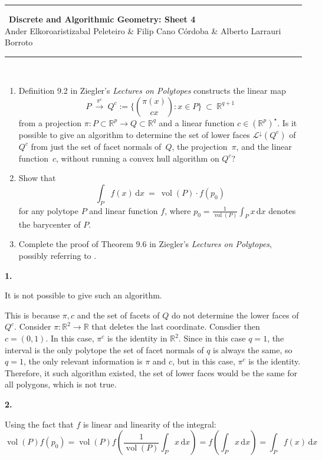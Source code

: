 \documentclass[10pt,a4paper]{article}
\DeclareMathOperator{\vol}{vol}
\newcommand{\RR}{\mathbb{R}}
\theoremstyle{plain}
\theoremstyle{remark}
\theoremstyle{definition}
\begin{document}
\thispagestyle{plain}
\begin{center}
\rule{\linewidth}{0.05mm}\
{\Large \textbf{Discrete and Algorithmic Geometry: Sheet 4\\}}
{\large Ander Elkoroaristizabal Peleteiro \& Filip Cano Córdoba \& Alberto Larrauri Borroto\\}
\rule{\linewidth}{0.05mm}\
\end{center}

\begin{enumerate}
	\item Definition 9.2 in Ziegler's \textit{Lectures on Polytopes} constructs the linear map
	\[
	P
	\ \xrightarrow{\pi^c}\ 
	Q^c :=
	\Big\{ \binom{\pi(x)}{cx} : x\in P\Big\}
	\ \subset \
	\RR^{q+1}
	\]
	from a projection $\pi:P\subset\RR^p\to Q\subset\RR^q$ and a linear function $c\in(\RR^p)^\star$.
	Is it possible to give an algorithm to determine the set of lower faces 
	$\mathcal L^\downarrow(Q^c)$ of $Q^c$ 
	from just the set of facet normals of~$Q$, 
	the projection~$\pi$, and the linear function~$c$, without running a convex hull algorithm on $Q^c$?
	
	\bigskip\bigskip
	\item Show that
	\[
	\int_P f(x)\,\text{d}x
	\ = \
	\vol(P) \cdot f(p_0)
	\]
	for any polytope $P$ and linear function $f$, 
	where $p_0 = \frac{1}{\vol(P)}\int_P x\,\text{d}x$ denotes the barycenter of $P$.
	\bigskip\bigskip
	\item Complete the proof of Theorem 9.6 in Ziegler's 
	\textit{Lectures on Polytopes}, 
	possibly referring to \cite{bs-1992}.
	
\end{enumerate}


\textbf{1.}

It is not possible to give such an algorithm.

This is because $\pi,c$ and the set of facets of $Q$ do not determine the lower faces of $Q^c$.
Consider $\pi:\RR^2\to \RR$ that deletes the last coordinate. 
Consdier then $c=(0,1)$. 
In this case, $\pi^c$ is the identity in $\RR^2$.
Since in this case $q=1$, the interval is the only polytope the set of facet normals of $q$ is always the same,
so $q=1$, the only relevant information is $\pi$ and $c$, but in this case, $\pi^c$ is the identity.
Therefore, it such algorithm existed, the set of lower faces would be the same for all polygons,
which is not true.

\textbf{2.}

Using the fact that $f$ is linear and linearity of the integral:
\begin{equation}
	\vol(P) f(p_0)
	= \vol(P) f\left( \frac1{\vol (P)}\int_P x\,\mathrm{d}x \right)
	= f\left(\int_P x\,\mathrm{d}x \right) 
	= \int_P f(x) \,\mathrm{d}x
\end{equation}
\end{document}

